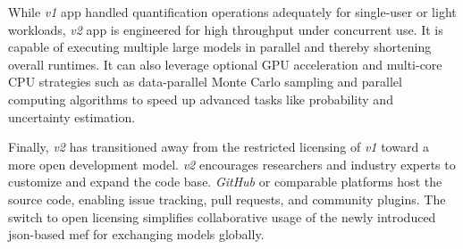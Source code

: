 While \textit{v1} app handled quantification operations adequately for single-user or light workloads, \textit{v2} app is engineered for high throughput under concurrent use. It is capable of executing multiple large models in parallel and thereby shortening overall runtimes. It can also leverage optional GPU acceleration and multi-core CPU strategies such as data-parallel Monte Carlo sampling and parallel computing algorithms to speed up advanced tasks like probability and uncertainty estimation.

Finally, \textit{v2} has transitioned away from the restricted licensing of \textit{v1} toward a more open development model. \textit{v2} encourages researchers and industry experts to customize and expand the code base. \textit{GitHub} or comparable platforms host the source code, enabling issue tracking, pull requests, and community plugins. The switch to open licensing simplifies collaborative usage of the newly introduced \acrshort{json}-based \acrshort{mef} for exchanging models globally.